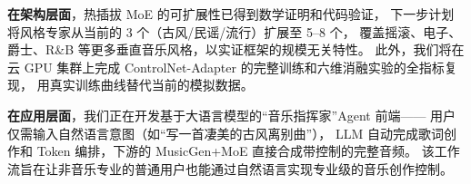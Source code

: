\textbf{在架构层面}，热插拔 MoE 的可扩展性已得到数学证明和代码验证，
下一步计划将风格专家从当前的 3 个（古风/民谣/流行）扩展至 5--8 个，
覆盖摇滚、电子、爵士、R\&B 等更多垂直音乐风格，以实证框架的规模无关特性。
此外，我们将在云 GPU 集群上完成 ControlNet-Adapter 的完整训练和六维消融实验的全指标复现，
用真实训练曲线替代当前的模拟数据。

\textbf{在应用层面}，我们正在开发基于大语言模型的“音乐指挥家”Agent 前端——
用户仅需输入自然语言意图（如“写一首凄美的古风离别曲”），
LLM 自动完成歌词创作和 Token 编排，下游的 MusicGen+MoE 直接合成带控制的完整音频。
该工作流旨在让非音乐专业的普通用户也能通过自然语言实现专业级的音乐创作控制。